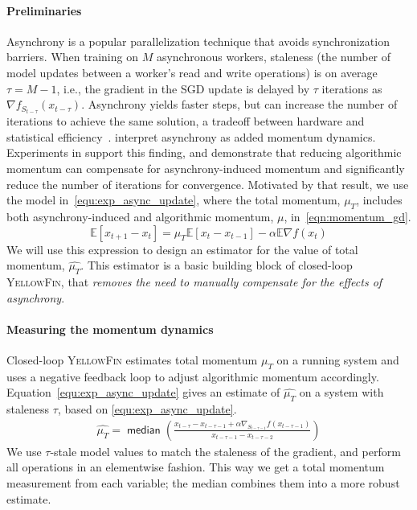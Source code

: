 \documentclass{article}
\newcommand{\asynctuner}{closed-loop \textsc{YellowFin}\xspace}
\newcommand{\Asynctuner}{Closed-loop \textsc{YellowFin}\xspace}
\begin{document}
\paragraph{Preliminaries}
Asynchrony is a popular parallelization technique \cite{recht2011hogwild} that avoids synchronization barriers.
When training on $M$ asynchronous workers, staleness (the number of model updates between a worker's read and write operations) is on average $\tau=M-1$,
i.e., the gradient in the SGD update is delayed by $\tau$ iterations as $\nabla f_{S_{t - \tau}}(x_{t - \tau} )$.
Asynchrony yields faster steps, but can
increase the number of iterations to achieve the same solution,
a tradeoff between hardware and statistical 
efficiency~\citep{DBLP:journals/pvldb/ZhangR14}.
\citet{mitliagkas2016asynchrony} interpret asynchrony as added momentum dynamics.
Experiments in \citet{hadjis2016omnivore} support this finding, and demonstrate that reducing algorithmic momentum can compensate for asynchrony-induced momentum
and significantly reduce the number of iterations for convergence.
Motivated by that result, we use the model
in~\eqref{equ:exp_async_update}, where the total momentum, $\mu_T$, includes both asynchrony-induced and algorithmic  momentum, $\mu$, in~\eqref{eqn:momentum_gd}.
\begin{equation}
	\mathbb{E}[ x_{t+1} - x_t ] 
	= \mu_T \mathbb{E}[x_t - x_{t-1}] - \alpha \mathbb{E}\nabla f(x_{t})
\label{equ:exp_async_update}
\end{equation}
We will use this expression to design an estimator for the value of total momentum, $\hat{\mu_T}$.
This estimator is a basic building block of \asynctuner, that {\em removes the need to manually compensate for the effects of asynchrony}.



\paragraph{Measuring the momentum dynamics}
\Asynctuner estimates total momentum $\mu_{T}$ on a running system and uses a negative feedback loop to adjust algorithmic momentum accordingly.
Equation~\eqref{equ:exp_async_update} gives an estimate of $\hat{\mu_T}$ on a system with staleness $\tau$, based on \eqref{equ:exp_async_update}.
\begin{align}
\hat{\mu_T}
					= \mathop{\mathsf{median}}\left(
							\frac{x_{t - \tau} - x_{t - \tau-1} + \alpha \nabla_{S_{t-\tau -1}} f(x_{t - \tau - 1} )}
							{x_{t - \tau-1} - x_{t - \tau-2}}
					\right)
\label{eqn:momentum_measurement}
\end{align}
We use $\tau$-stale model values to match the staleness of the gradient,  and perform all operations in an elementwise fashion. 
This way we get a total momentum measurement from each variable; 
the median combines them into a more robust estimate.
\end{document}
